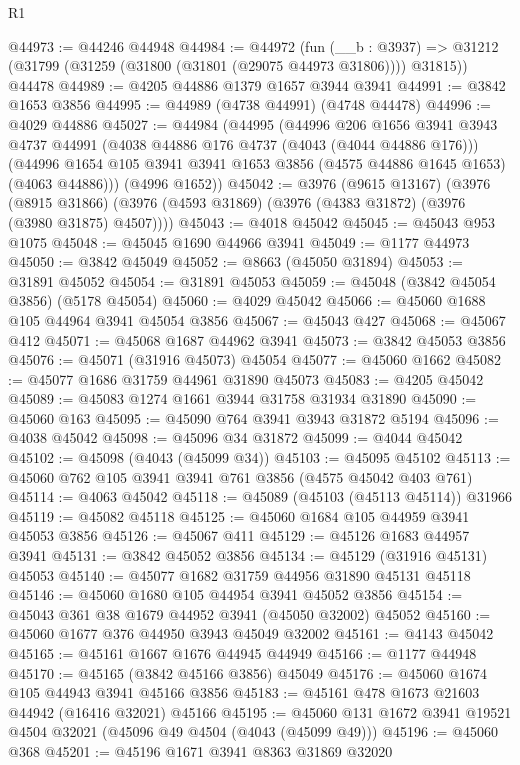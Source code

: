 \begin{lexlean}{R1}
\begin{coremodule}
@44973 := @44246 @44948
@44984 := @44972
    (fun (__b : @3937) => @31212 (@31799 (@31259 (@31800 (@31801 (@29075 @44973 @31806)))) @31815))
    @44478
@44989 := @4205 @44886 @1379 @1657 @3944 @3941
@44991 := @3842 @1653 @3856
@44995 := @44989 (@4738 @44991) (@4748 @44478)
@44996 := @4029 @44886
@45027 := @44984
    (@44995
      (@44996
        @206
        @1656
        @3941
        @3943
        @4737
        @44991
        (@4038 @44886 @176 @4737 (@4043 (@4044 @44886 @176)))
        (@44996 @1654 @105 @3941 @3941 @1653 @3856 (@4575 @44886 @1645 @1653) (@4063 @44886)))
      (@4996 @1652))
@45042 := @3976
    (@9615 @13167)
    (@3976
      (@8915 @31866)
      (@3976 (@4593 @31869) (@3976 (@4383 @31872) (@3976 (@3980 @31875) @4507))))
@45043 := @4018 @45042
@45045 := @45043 @953 @1075
@45048 := @45045 @1690 @44966 @3941
@45049 := @1177 @44973
@45050 := @3842 @45049
@45052 := @8663 (@45050 @31894)
@45053 := @31891 @45052
@45054 := @31891 @45053
@45059 := @45048 (@3842 @45054 @3856) (@5178 @45054)
@45060 := @4029 @45042
@45066 := @45060 @1688 @105 @44964 @3941 @45054 @3856
@45067 := @45043 @427
@45068 := @45067 @412
@45071 := @45068 @1687 @44962 @3941
@45073 := @3842 @45053 @3856
@45076 := @45071 (@31916 @45073) @45054
@45077 := @45060 @1662
@45082 := @45077 @1686 @31759 @44961 @31890 @45073
@45083 := @4205 @45042
@45089 := @45083 @1274 @1661 @3944 @31758 @31934 @31890
@45090 := @45060 @163
@45095 := @45090 @764 @3941 @3943 @31872 @5194
@45096 := @4038 @45042
@45098 := @45096 @34 @31872
@45099 := @4044 @45042
@45102 := @45098 (@4043 (@45099 @34))
@45103 := @45095 @45102
@45113 := @45060 @762 @105 @3941 @3941 @761 @3856 (@4575 @45042 @403 @761)
@45114 := @4063 @45042
@45118 := @45089 (@45103 (@45113 @45114)) @31966
@45119 := @45082 @45118
@45125 := @45060 @1684 @105 @44959 @3941 @45053 @3856
@45126 := @45067 @411
@45129 := @45126 @1683 @44957 @3941
@45131 := @3842 @45052 @3856
@45134 := @45129 (@31916 @45131) @45053
@45140 := @45077 @1682 @31759 @44956 @31890 @45131 @45118
@45146 := @45060 @1680 @105 @44954 @3941 @45052 @3856
@45154 := @45043 @361 @38 @1679 @44952 @3941 (@45050 @32002) @45052
@45160 := @45060 @1677 @376 @44950 @3943 @45049 @32002
@45161 := @4143 @45042
@45165 := @45161 @1667 @1676 @44945 @44949
@45166 := @1177 @44948
@45170 := @45165 (@3842 @45166 @3856) @45049
@45176 := @45060 @1674 @105 @44943 @3941 @45166 @3856
@45183 := @45161 @478 @1673 @21603 @44942 (@16416 @32021) @45166
@45195 := @45060 @131 @1672 @3941 @19521 @4504 @32021 (@45096 @49 @4504 (@4043 (@45099 @49)))
@45196 := @45060 @368
@45201 := @45196 @1671 @3941 @8363 @31869 @32020

\end{coremodule}
\end{lexlean}
